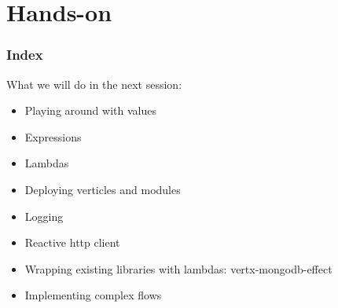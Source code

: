 \documentclass{beamer}
\begin{document}
\section{Hands-on}

\begin{frame}
\frametitle{Index}
What we will do in the next session:
\begin{itemize}
\item<1->  Playing around with values
\item<2->  Expressions
\item<3->  Lambdas
\item<4->  Deploying verticles and modules
\item<5->  Logging
\item<6->  Reactive http client
\item<7->  Wrapping existing libraries with lambdas: vertx-mongodb-effect
\item<8->  Implementing complex flows
\end{itemize}
\end{frame}
\end{document}
